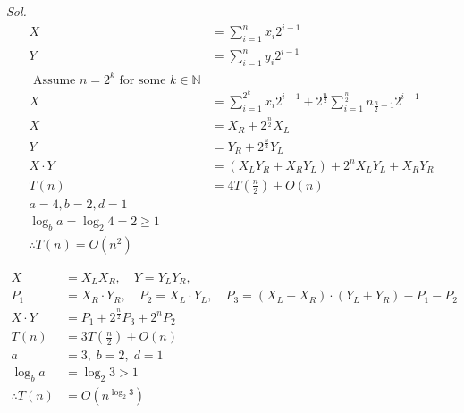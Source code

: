 \textit{ Sol. }
\begin{align*}
	X         & = \sum_{i=1}^{n} x_i 2^{i-1}                                                                        \\
	Y         & = \sum_{i=1}^{n} y_i 2^{i-1}                                                                        \\
	\text{ Assume } n = 2^k \text{ for some } k \in \mathbb{N}                                                      \\
	X         & = \sum_{i=1}^{2^k} x_i 2^{i-1} + 2^{\frac{n}{2}} \sum_{i=1}^{\frac{n}{2}} n_{\frac{n}{2}+1} 2^{i-1} \\
	X         & = X_R + 2^{\frac{n}{2}} X_L                                                                         \\
	Y         & = Y_R + 2^{\frac{n}{2}} Y_L                                                                         \\
	X \cdot Y & = (X_L Y_R + X_R Y_L) + 2^n X_L Y_L + X_R Y_R                                                       \\
	T(n)      & = 4T\left(\frac{n}{2}\right) + O(n)                                                                 \\
	a = 4, b = 2, d = 1                                                                                             \\
	\log_b a = \log_2 4 = 2 \geq 1                                                                                  \\
	\therefore T(n) = O(n^2)
\end{align*}


\begin{align*}
	X               & = X_L  X_R, \quad Y = Y_L  Y_R, \quad                                                           \\
	P_1             & = X_R \cdot Y_R, \quad P_2 = X_L \cdot Y_L, \quad P_3 = (X_L + X_R) \cdot (Y_L + Y_R) - P_1 - P_2 \\
	X \cdot Y       & = P_1 + 2^{\frac{n}{2}}P_3 + 2^n P_2                                                              \\
	T(n)            & = 3T\left(\frac{n}{2}\right) + O(n)                                                               \\
	a               & = 3, \; b = 2, \; d = 1                                                                           \\
	\log_b a        & = \log_2 3 > 1                                                                                    \\
	\therefore T(n) & = O(n^{\log_2 3})
\end{align*}

